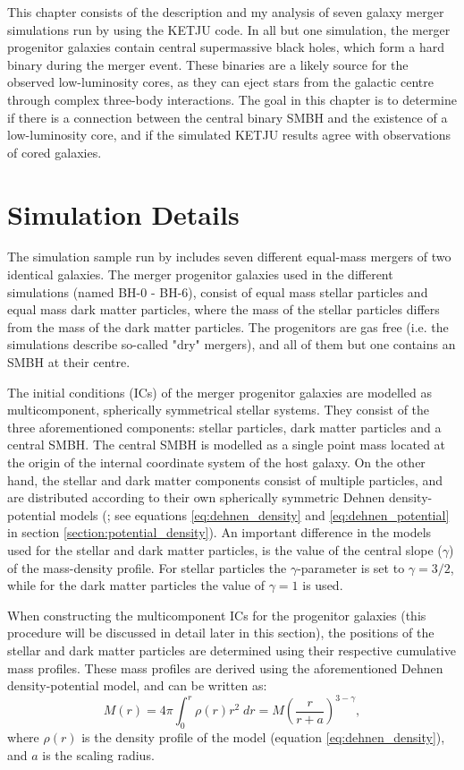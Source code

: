 \documentclass[english, twoside]{HYgradu}
\begin{document}
This chapter consists of the description and my analysis of seven galaxy merger simulations run by \cite{Rantala2018} using the KETJU code. In all but one simulation, the merger progenitor galaxies contain central supermassive black holes, which form a hard binary during the merger event. These binaries are a likely source for the observed low-luminosity cores, as they can eject stars from the galactic centre through complex three-body interactions. The goal in this chapter is to determine if there is a connection between the central binary SMBH and the existence of a low-luminosity core, and if the simulated KETJU results agree with observations of cored galaxies.

\section{Simulation Details}

The simulation sample run by \cite{Rantala2018} includes seven different equal-mass mergers of two identical galaxies. The merger progenitor galaxies used in the different simulations (named BH-0 - BH-6), consist of equal mass stellar particles and equal mass dark matter particles, where the mass of the stellar particles differs from the mass of the dark matter particles. The progenitors are gas free (i.e. the simulations describe so-called "dry" mergers), and all of them but one contains an SMBH at their centre.

The initial conditions (ICs) of the merger progenitor galaxies are modelled as multicomponent, spherically symmetrical stellar systems. They consist of the three aforementioned components: stellar particles, dark matter particles and a central SMBH. The central SMBH is modelled as a single point mass located at the origin of the internal coordinate system of the host galaxy. On the other hand, the stellar and dark matter components consist of multiple particles, and are distributed according to their own spherically symmetric Dehnen density-potential models (\citealt{Dehnen1993}; see equations \ref{eq:dehnen_density} and \ref{eq:dehnen_potential} in section \ref{section:potential_density}). An important difference in the models used for the stellar and dark matter particles, is the value of the central slope ($\gamma$) of the mass-density profile. For stellar particles the $\gamma$-parameter is set to $\gamma = 3/2$, while for the dark matter particles the value of $\gamma = 1$ is used.

When constructing the multicomponent ICs for the progenitor galaxies (this procedure will be discussed in detail later in this section), the positions of the stellar and dark matter particles are determined using their respective cumulative mass profiles. These mass profiles are derived using the aforementioned Dehnen density-potential model, and can be written as:
\begin{equation}
M(r) = 4\pi \int^r_0 \rho(r)r^2 \;dr = M \left( \frac{r}{r+a} \right)^{3-\gamma}, \label{eq:cumulative_mass}
\end{equation}
where $\rho(r)$ is the density profile of the model (equation \ref{eq:dehnen_density}), and $a$ is the scaling radius.
\end{document}
